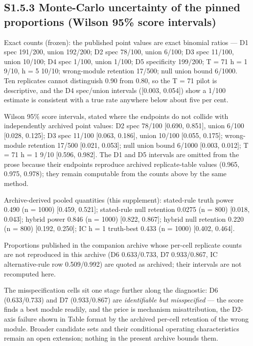 \documentclass[11pt]{article}
\begin{document}
\subsection{S1.5.3 Monte-Carlo uncertainty of the pinned proportions
(Wilson 95\% score
intervals)}\label{s1.5.3-monte-carlo-uncertainty-of-the-pinned-proportions-wilson-95-score-intervals}

Exact counts (frozen): the published point values are exact binomial
ratios --- D1 spec 191/200, union 192/200; D2 spec 78/100, union 6/100;
D3 spec 11/100, union 10/100; D4 spec 1/100, union 1/100; D5 specificity
199/200; T = 71 h = 1 9/10, h = 5 10/10; wrong-module retention 17/500;
null union bound 6/1000. Ten replicates cannot distinguish 0.90 from
0.80, so the T = 71 pilot is descriptive, and the D4 spec/union
intervals ({[}0.003, 0.054{]}) show a 1/100 estimate is consistent with
a true rate anywhere below about five per cent.

Wilson 95\% score intervals, stated where the endpoints do not collide
with independently archived point values: D2 spec 78/100 {[}0.690,
0.851{]}, union 6/100 {[}0.028, 0.125{]}; D3 spec 11/100 {[}0.063,
0.186{]}, union 10/100 {[}0.055, 0.175{]}; wrong-module retention 17/500
{[}0.021, 0.053{]}; null union bound 6/1000 {[}0.003, 0.012{]}; T = 71 h
= 1 9/10 {[}0.596, 0.982{]}. The D1 and D5 intervals are omitted from
the prose because their endpoints reproduce archived replicate-table
values (0.965, 0.975, 0.978); they remain computable from the counts
above by the same method.

Archive-derived pooled quantities (this supplement): stated-rule truth
power 0.490 (n = 1000) {[}0.459, 0.521{]}; stated-rule null retention
0.0275 (n = 800) {[}0.018, 0.043{]}; hybrid power 0.846 (n = 1000)
{[}0.822, 0.867{]}; hybrid null retention 0.220 (n = 800) {[}0.192,
0.250{]}; IC h = 1 truth-best 0.433 (n = 1000) {[}0.402, 0.464{]}.

Proportions published in the companion archive whose per-cell replicate
counts are not reproduced in this archive (D6 0.633/0.733, D7
0.933/0.867, IC alternative-rule row 0.509/0.992) are quoted as
archived; their intervals are not recomputed here.

The misspecification cells sit one stage further along the diagnostic:
D6 (0.633/0.733) and D7 (0.933/0.867) are \emph{identifiable but
misspecified} --- the score finds a best module readily, and the price
is mechanism misattribution, the D2-axis failure shown in Table format
by the archived per-cell retention of the wrong module. Broader
candidate sets and their conditional operating characteristics remain an
open extension; nothing in the present archive bounds them.
\end{document}
